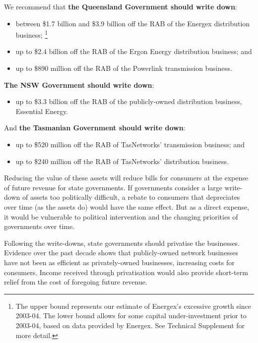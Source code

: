 \documentclass[FrontPage]{grattan}
\begin{document}
We recommend that \textbf{the Queensland Government should write down}:
\begin{itemize}
 \item between \$1.7 billion and \$3.9 billion off the RAB of the Energex distribution business;%
 \footnote{The upper bound represents our estimate of Energex's excessive growth since 2003-04. The lower bound allows for some capital under-investment prior to 2003-04, based on data provided by Energex. See Technical Supplement for more detail.}
 \item up to \$2.4 billion off the RAB of the Ergon Energy distribution business; and
 \item up to \$890 million off the RAB of the Powerlink transmission business.
\end{itemize}

\textbf{The NSW Government should write down}:
\begin{itemize}
 \item up to \$3.3 billion off the RAB of the publicly-owned distribution business, Essential Energy.
\end{itemize}

And \textbf{the Tasmanian Government should write down}:
\begin{itemize}
 \item up to \$520 million off the RAB of TasNetworks' transmission business; and 
 \item up to \$240 million off the RAB of TasNetworks' distribution business.
\end{itemize}


Reducing the value of these assets will reduce bills for consumers at the expense of future revenue for state governments. If governments consider a large write-down of assets too politically difficult, a rebate to consumers that depreciates over time (as the assets do) would have the same effect. But as a direct expense, it would be vulnerable to political intervention and the changing priorities of governments over time.

Following the write-downs, state governments should privatise the businesses. Evidence over the past decade shows that publicly-owned network businesses have not been as efficient as privately-owned businesses, increasing costs for consumers. Income received through privatisation would also provide short-term relief from the cost of foregoing future revenue.
\end{document}
